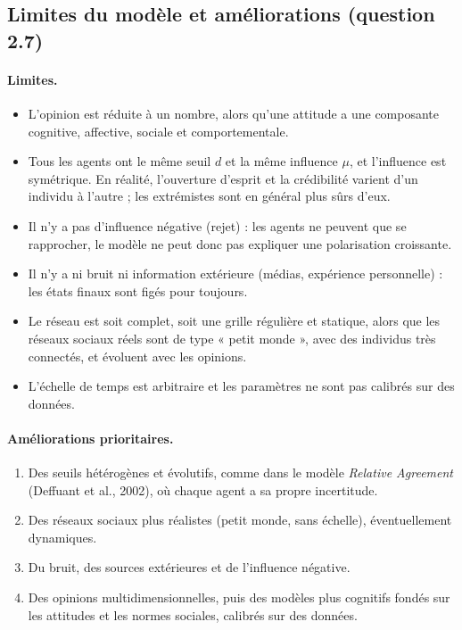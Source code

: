 \documentclass[11pt,a4paper]{article}
\begin{document}
\subsection{Limites du modèle et améliorations (question 2.7)}

\paragraph{Limites.}
\begin{itemize}
  \item L'opinion est réduite à un nombre, alors qu'une attitude a une composante cognitive,
  affective, sociale et comportementale.
  \item Tous les agents ont le même seuil $d$ et la même influence $\mu$, et l'influence est
  symétrique. En réalité, l'ouverture d'esprit et la crédibilité varient d'un individu à
  l'autre ; les extrémistes sont en général plus sûrs d'eux.
  \item Il n'y a pas d'influence négative (rejet) : les agents ne peuvent que se rapprocher,
  le modèle ne peut donc pas expliquer une polarisation croissante.
  \item Il n'y a ni bruit ni information extérieure (médias, expérience personnelle) : les
  états finaux sont figés pour toujours.
  \item Le réseau est soit complet, soit une grille régulière et statique, alors que les
  réseaux sociaux réels sont de type « petit monde », avec des individus très connectés,
  et évoluent avec les opinions.
  \item L'échelle de temps est arbitraire et les paramètres ne sont pas calibrés sur des
  données.
\end{itemize}

\paragraph{Améliorations prioritaires.}
\begin{enumerate}
  \item Des seuils hétérogènes et évolutifs, comme dans le modèle \textit{Relative Agreement}
  (Deffuant et al., 2002), où chaque agent a sa propre incertitude.
  \item Des réseaux sociaux plus réalistes (petit monde, sans échelle), éventuellement
  dynamiques.
  \item Du bruit, des sources extérieures et de l'influence négative.
  \item Des opinions multidimensionnelles, puis des modèles plus cognitifs fondés sur les
  attitudes et les normes sociales, calibrés sur des données.
\end{enumerate}
\end{document}

